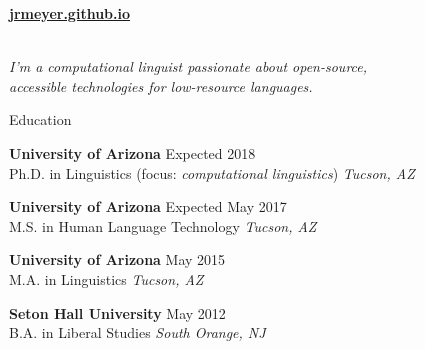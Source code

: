 \documentclass{resume} %
\begin{document}
\vspace{-.25cm}
\begin{center}
  \href{https://jrmeyer.github.io}{\textbf{jrmeyer.github.io}} \\
  \href{https://github.com/JRMeyer}{\faGithub} \\

\vspace{.5cm}

\textit{I'm a computational linguist passionate about open-source, \\
accessible technologies for low-resource languages.}
\end{center}


\vspace{.5cm}
\begin{rSection}{Education}

{\bf University of Arizona} \hfill {Expected 2018} \\ 
Ph.D. in Linguistics (focus: \textit{computational linguistics}) \hfill {\em Tucson, AZ}

\vspace{.15cm}

{\bf University of Arizona} \hfill {Expected May 2017} \\ 
M.S. in Human Language Technology \hfill {\em Tucson, AZ}

\vspace{.15cm}

{\bf University of Arizona} \hfill {May 2015} \\ 
M.A. in Linguistics \hfill {\em Tucson, AZ}

\vspace{.15cm}

{\bf Seton Hall University} \hfill {May 2012} \\ 
B.A. in Liberal Studies  \hfill {\em South Orange, NJ} \\



\end{rSection}
\end{document}
